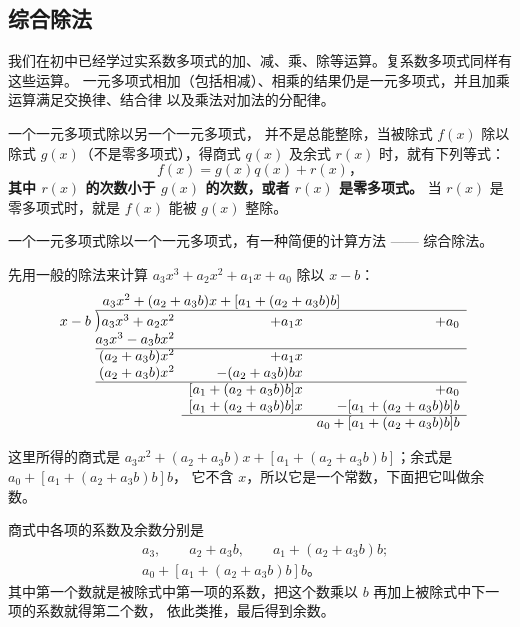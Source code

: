 \subsection{综合除法}\label{subsec:1-2}

我们在初中已经学过实系数多项式的加、减、乘、除等运算。复系数多项式同样有这些运算。
一元多项式相加（包括相减）、相乘的结果仍是一元多项式，并且加乘运算满足交换律、结合律
以及乘法对加法的分配律。

一个一元多项式除以另一个一元多项式， 并不是总能整除，当被除式 $f(x)$ 除以
除式 $g(x)$（不是零多项式），得商式 $q(x)$ 及余式 $r(x)$ 时，就有下列等式：
$$ f(x) = g(x) q(x) + r(x) \text{，} $$
\textbf{其中 $r(x)$ 的次数小于 $g(x)$ 的次数，或者 $r(x)$ 是零多项式。}
当 $r(x)$ 是零多项式时，就是 $f(x)$ 能被 $g(x)$ 整除。

一个一元多项式除以一个一元多项式，有一种简便的计算方法 —— 综合除法。

先用一般的除法来计算 $a_3x^3 + a_2x^2 + a_1x + a_0$ 除以 $x - b$：
$$
\begin{array}{r@{\;}r@{}rrrr}
    & & \multicolumn{3}{l}{a_3x^2 + (a_2 + a_3b)x + [a_1 + (a_2 + a_3b)b]} \\
    \cline{3-5}
    x-b & \vstretch{1.3}{\big)}\mkern-7.3mu & \; a_3x^3 + a_2x^2 & + a_1x & + a_0 \\
    & & a_3x^3 - a_3bx^2 & \\
    \cline{3-5}
    & & (a_2 + a_3b)x^2 & + a_1x & \\
    & & (a_2 + a_3b)x^2 & - (a_2 + a_3b)bx & \\
    \cline{3-5}
    & & & [a_1 + (a_2 + a_3b)b]x & + a_0  \\
    & & & [a_1 + (a_2 + a_3b)b]x & - [a_1 + (a_2 + a_3b)b]b \\
    \cline{4-5}
    & & & & a_0 + [a_1 + (a_2 + a_3b)b]b
\end{array}
$$

这里所得的商式是 $a_3x^2 + (a_2 + a_3b)x + [a_1 + (a_2 + a_3b)b]$；余式是 $a_0 + [a_1 + (a_2 + a_3b)b]b$，
它不含 $x$，所以它是一个常数，下面把它叫做余数。

商式中各项的系数及余数分别是
\begin{align*}
    & a_3, \qquad a_2 + a_3b, \qquad a_1 + (a_2 + a_3b)b ; \\
    & a_0 + [a_1 + (a_2 + a_3b)b]b \text{。}
\end{align*}
其中第一个数就是被除式中第一项的系数，把这个数乘以 $b$ 再加上被除式中下一项的系数就得第二个数，
依此类推，最后得到余数。

